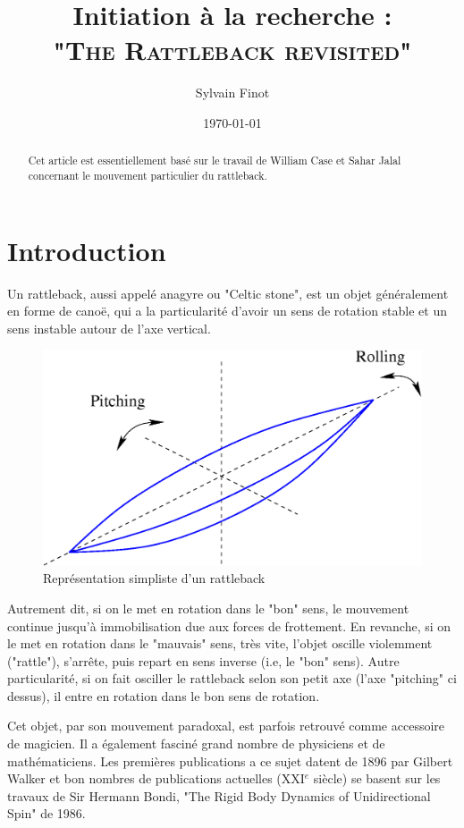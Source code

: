 \documentclass[12pt,a4paper]{article}
\author{Sylvain Finot}
\title{Initiation à la recherche :\\[5pt] \scshape "The Rattleback revisited"}
\date{\today}
\begin{document}
\maketitle
\thispagestyle{firststyle}
\begin{abstract}
	Cet article est essentiellement basé sur le travail de William Case et Sahar Jalal concernant le mouvement particulier du rattleback.
\end{abstract}
\section{Introduction}
Un rattleback, aussi appelé anagyre ou "Celtic stone", est un objet généralement en forme de canoë, qui a la particularité d'avoir un sens de rotation stable et un sens instable autour de l'axe vertical.
\begin{figure}[h]
	\centering
	\includegraphics[scale=0.2]{Rolling-pitching}
	\caption[]{Représentation simpliste d'un rattleback}
	\label{fig:rolling-pitching}
\end{figure}

Autrement dit, si on le met en rotation dans le "bon" sens, le mouvement continue jusqu'à immobilisation due aux forces de frottement. En revanche, si on le met en rotation dans le "mauvais" sens, très vite, l'objet oscille violemment ("rattle"), s'arrête, puis repart en sens inverse (i.e, le "bon" sens). Autre particularité, si on fait osciller le rattleback selon son petit axe (l'axe "pitching" ci dessus), il entre en rotation dans le bon sens de rotation.

Cet objet, par son mouvement paradoxal, est parfois retrouvé comme accessoire de magicien.
Il a également fasciné grand nombre de physiciens et de mathématiciens. Les premières publications a ce sujet datent de 1896 par Gilbert Walker et bon nombres de publications actuelles (XXI$^{e}$ siècle) se basent sur les travaux de Sir Hermann Bondi, "The Rigid Body Dynamics of Unidirectional Spin" de 1986.
\end{document}
